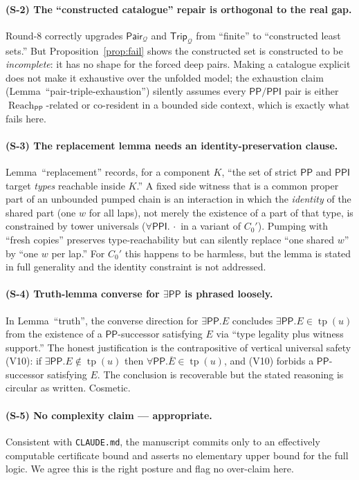 \documentclass[11pt]{article}
\newcommand{\PP}{\mathsf{PP}}
\newcommand{\PPI}{\mathsf{PPI}}
\newcommand{\reach}{\operatorname{Reach}}
\newcommand{\tp}{\operatorname{tp}}
\newcommand{\Pair}{\mathsf{Pair}}
\newcommand{\Trip}{\mathsf{Trip}}
\newcommand{\Q}{\mathcal Q}
\begin{document}
\paragraph{(S-2) The ``constructed catalogue'' repair is orthogonal to the real
gap.}
Round-8 correctly upgrades $\Pair_\Q$ and $\Trip_\Q$ from ``finite'' to
``constructed least sets.''  But Proposition~\ref{prop:fail} shows the
constructed set is constructed to be \emph{incomplete}: it has no shape for the
forced deep pairs.  Making a catalogue explicit does not make it exhaustive over
the unfolded model; the exhaustion claim (Lemma~``pair-triple-exhaustion'') silently
assumes every $\PP/\PPI$ pair is either $\reach_{\PP}$-related or co-resident in a
bounded side context, which is exactly what fails here.

\paragraph{(S-3) The replacement lemma needs an identity-preservation clause.}
Lemma~``replacement'' records, for a component $K$, ``the set of strict $\PP$ and
$\PPI$ target \emph{types} reachable inside $K$.''  A fixed side witness that is a
common proper part of an unbounded pumped chain is an interaction in which the
\emph{identity} of the shared part (one $w$ for all laps), not merely the
existence of a part of that type, is constrained by tower universals
($\forall\PPI.\,\cdot$ in a variant of $C_0'$).  Pumping with ``fresh copies''
preserves type-reachability but can silently replace ``one shared $w$'' by ``one
$w$ per lap.''  For $C_0'$ this happens to be harmless, but the lemma is stated
in full generality and the identity constraint is not addressed.

\paragraph{(S-4) Truth-lemma converse for $\exists\PP$ is phrased loosely.}
In Lemma~``truth'', the converse direction for $\exists\PP.E$ concludes
$\exists\PP.E\in\tp(u)$ from the existence of a $\PP$-successor satisfying $E$ via
``type legality plus witness support.''  The honest justification is the
contrapositive of vertical universal safety (V10): if $\exists\PP.E\notin\tp(u)$
then $\forall\PP.\overline E\in\tp(u)$, and (V10) forbids a $\PP$-successor
satisfying $E$.  The conclusion is recoverable but the stated reasoning is
circular as written.  Cosmetic.

\paragraph{(S-5) No complexity claim --- appropriate.}
Consistent with \texttt{CLAUDE.md}, the manuscript commits only to an effectively
computable certificate bound and asserts no elementary upper bound for the full
logic.  We agree this is the right posture and flag no over-claim here.
\end{document}
